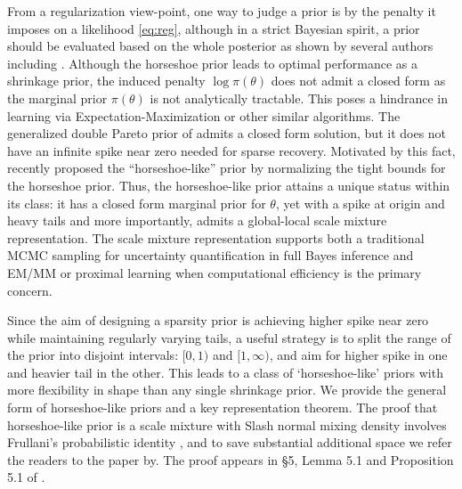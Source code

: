 \documentclass[sts,preprint]{imsart}
\begin{document}
From a regularization view-point, one way to judge a prior is by the penalty it imposes on a likelihood \eqref{eq:reg}, although in a strict Bayesian spirit, a prior should be evaluated based on the whole posterior as shown by several authors including \citep{castillo2015bayesian, van2017adaptive}. %
Although the horseshoe prior leads to optimal performance as a shrinkage prior, the induced penalty $\log \pi(\theta)$ does not admit a closed form as the marginal prior $\pi(\theta)$ is not analytically tractable. This poses a hindrance in learning via Expectation-Maximization or other similar algorithms.  The generalized double Pareto prior of
\citet{armagan2011generalized} admits a closed form solution, but it does not have an infinite spike near zero needed for sparse recovery. Motivated by this fact, \citet{bhadra2017horseshoe} recently proposed the ``horseshoe-like'' prior by normalizing the tight bounds for the horseshoe prior. Thus, the horseshoe-like
prior attains a unique status within its class: it has a closed form marginal prior for $\theta$, yet with a spike at origin and heavy tails and more importantly, admits a global-local scale mixture representation. The scale mixture representation supports both a traditional MCMC sampling for uncertainty
quantification in full Bayes inference and EM/MM or proximal learning when computational efficiency is the primary concern. 

Since the aim of designing a sparsity prior is achieving higher spike near zero while maintaining regularly varying tails, a useful strategy is to split the range of the prior into disjoint intervals: $[0,1)$ and $[1, \infty)$, and aim for higher spike in one and heavier tail in the other. This leads to a class of `horseshoe-like' priors with more flexibility in shape than any single shrinkage prior. We provide the
general form of horseshoe-like priors and a key representation theorem.  The proof that horseshoe-like prior is a scale mixture with Slash normal mixing density involves Frullani's probabilistic identity \citep[\textit{vide}][pages 406-407]{jeffreys1972methods}, and to save substantial additional space we refer the readers to the paper by\citep{bhadra2017horseshoe}. The proof appears in \S 5, Lemma 5.1 and Proposition 5.1 of \citet{bhadra2017horseshoe}.
\end{document}
